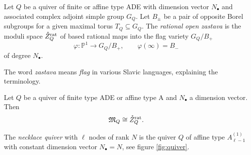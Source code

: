 \begin{definition}
	Let $Q$ be a quiver of finite or affine type ADE with dimension vector $N_\bullet$ and associated complex adjoint simple group $G_Q$. Let $B_\pm$ be a pair of opposite Borel subgroups for a given maximal torus $T_Q \subseteq G_Q$. The \emph{rational open zastava} is the moduli space $\mathring Z_Q^\textup{rat}$ of based rational maps into the flag variety $G_Q/B_+$
	\begin{equation}
		\varphi\colon \mathbb{P}^1 \to G_Q/B_+, \qquad \varphi(\infty) = B_-
	\end{equation}
	of degree $N_\bullet$.
\end{definition}

\begin{remark}
	The word \emph{zastava} means \emph{flag} in various Slavic languages, explaining the terminology.
\end{remark}

\begin{theorem}
	Let $Q$ be a quiver of finite type ADE or affine type A and $N_\bullet$ a dimension vector. Then 
	\begin{equation}
		\mathfrak{M}_Q \cong \mathring Z_Q^\textup{rat}.
	\end{equation}
\end{theorem}

\begin{definition}
	The \emph{necklace quiver} with $\ell$ nodes of rank $N$ is the quiver $Q$ of affine type $A_{\ell-1}^{(1)}$ with constant dimension vector $N_\bullet = N$, see figure \ref{fig:quiver}.
\end{definition}

